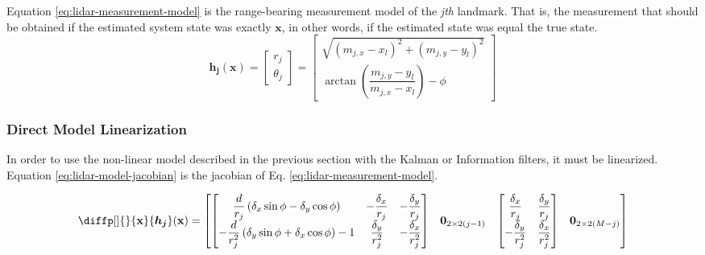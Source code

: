 \documentclass[12pt]{article}
\newcommand{\bvec}[1]{\mathbf{#1}} %
\newcommand{\mat}[1]{\mathbf{#1}}
\newcommand{\parentheses}[1]{\left(#1\right)}
\newcommand{\mb}[1]{{\boldsymbol{#1}}} %
\newcommand{\matnull}[2]{\mat{0}_{#1\times#2}} %
\begin{document}
Equation \ref{eq:lidar-measurement-model} is the range-bearing measurement model of the \textit{jth} landmark. That is, the measurement that should be obtained if the estimated system state was exactly $\mathbf{x}$, in other words, if the estimated state was equal the true state.
\renewcommand{\arraystretch}{1.5}
\begin{equation}
    \mb{h_j}(\mathbf{x}) = \begin{bmatrix}
        r_j \\ \theta_j     
    \end{bmatrix} = 
    \begin{bmatrix}
        \sqrt{(m_{j,x} - x_l)^2 + (m_{j, y} - y_l)^2} \\
        \arctan\left(\dfrac{m_{j,y} - y_l}{m_{j,x} - x_l}\right) - \phi
    \end{bmatrix}
    \label{eq:lidar-measurement-model}
\end{equation}
\renewcommand{\arraystretch}{1.0}

\subsubsection{Direct Model Linearization}
In order to use the non-linear model described in the previous section with the Kalman or Information filters, it must be linearized. Equation \ref{eq:lidar-model-jacobian} is the jacobian of Eq. \ref{eq:lidar-measurement-model}.

\renewcommand{\arraystretch}{1.5}
\begin{equation}
    \diffp[]{}{\bvec{x}} \mb{h_j}(\bvec{x}) = \begin{bmatrix}
        \begin{bmatrix}
            \dfrac{d}{r_j}\parentheses{\delta_x \sin\phi - \delta_y \cos\phi} &  -\dfrac{\delta_x}{r_j} & -\dfrac{\delta_y}{r_j}\\
            -\dfrac{d}{r_j^2}\parentheses{\delta_y \sin\phi + \delta_x \cos\phi} - 1 & \dfrac{\delta_y}{r_j^2} & -\dfrac{\delta_x}{r_j^2}
        \end{bmatrix} &
        \matnull{2}{2(j-1)} &
        \begin{bmatrix}
            \dfrac{\delta_x}{r_j} & \dfrac{\delta_y}{r_j} \\
            -\dfrac{\delta_y}{r_j^2} & \dfrac{\delta_x}{r_j^2}
        \end{bmatrix} &
        \matnull{2}{2(M-j)} 
    \end{bmatrix} 
    \label{eq:lidar-model-jacobian}
\end{equation}
\renewcommand{\arraystretch}{1.0}
\end{document}

